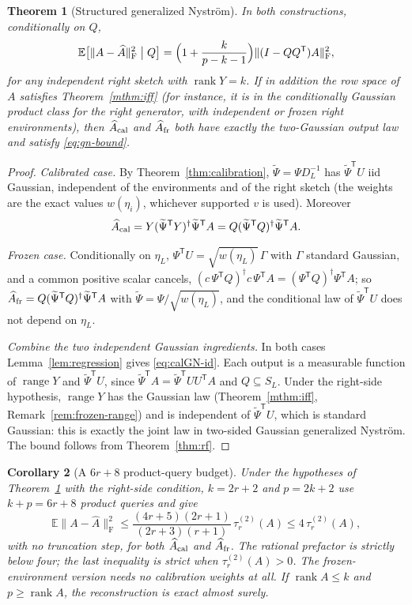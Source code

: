 \documentclass[11pt,a4paper]{article}
\newtheorem{theorem}{Theorem}[section]
\newtheorem{corollary}[theorem]{Corollary}
\theoremstyle{definition}
\theoremstyle{remark}
\numberwithin{equation}{section}
\newcommand{\E}{\mathbb E}
\newcommand{\T}{{\mathsf T}}
\newcommand{\rank}{\operatorname{rank}}
\newcommand{\range}{\operatorname{range}}
\newcommand{\norm}[1]{\lVert#1\rVert}
\newcommand{\F}{\mathrm F}
\begin{document}
\begin{theorem}[Structured generalized Nystr\"om]\label{thm:calGN}
In both constructions, conditionally on $Q$,
\begin{equation}\label{eq:calGN-id}
 \E\bigl[\norm{A-\widehat A}_\F^2\bigm| Q\bigr]
 =\Bigl(1+\frac k{p-k-1}\Bigr)\norm{(I-QQ^\T)A}_\F^2 ,
\end{equation}
for any independent right sketch with $\rank Y=k$. If in addition the row
space of $A$ satisfies Theorem~\ref{mthm:iff} (for instance, it is in the
conditionally Gaussian product class for the right generator, with
independent or frozen right environments), then $\widehat A_{\rm cal}$ and
$\widehat A_{\rm fr}$ both have exactly the two-Gaussian output law and satisfy
\eqref{eq:gn-bound}.
\end{theorem}

\begin{proof}
\emph{Calibrated case.} By Theorem~\ref{thm:calibration}, $\widetilde\Psi=\Psi D_L^{-1}$
has $\widetilde\Psi^\T U$ iid Gaussian, independent of the environments and of
the right sketch (the weights are the exact values $w(\eta_i)$, whichever
supported $v$ is used). Moreover
\[
 \widehat A_{\rm cal}
 =Y(\widetilde\Psi^\T Y)^\dagger\widetilde\Psi^\T A
 =Q(\widetilde\Psi^\T Q)^\dagger\widetilde\Psi^\T A.
\]

\emph{Frozen case.} Conditionally
on $\eta_L$, $\Psi^\T U=\sqrt{w(\eta_L)}\,\Gamma$ with $\Gamma$ standard Gaussian,
and a common positive scalar cancels,
$(c\,\Psi^\T Q)^\dagger c\,\Psi^\T A=(\Psi^\T Q)^\dagger\Psi^\T A$; so
$\widehat A_{\rm fr}=Q(\widetilde\Psi^\T Q)^\dagger\widetilde\Psi^\T A$ with
$\widetilde\Psi=\Psi/\sqrt{w(\eta_L)}$, and the conditional law of
$\widetilde\Psi^\T U$ does not depend on $\eta_L$.

\emph{Combine the two independent Gaussian ingredients.} In both cases
Lemma~\ref{lem:regression} gives \eqref{eq:calGN-id}. Each output is a
measurable function of $\range Y$ and $\widetilde\Psi^\T U$, since
$\widetilde\Psi^\T A=\widetilde\Psi^\T UU^\T A$ and $Q\subseteq S_L$. Under the
right-side hypothesis, $\range Y$ has the Gaussian law
(Theorem~\ref{mthm:iff}, Remark~\ref{rem:frozen-range}) and is independent of
$\widetilde\Psi^\T U$, which is standard Gaussian: this is exactly the joint law
in two-sided Gaussian generalized Nystr\"om. The bound follows from
Theorem~\ref{thm:rf}.
\end{proof}

\begin{corollary}[A $6r+8$ product-query budget]\label{cor:6r8}
Under the hypotheses of Theorem~\ref{thm:calGN} with the right-side condition,
$k=2r+2$ and $p=2k+2$ use $k+p=6r+8$ product queries and give
\[
 \E\norm{A-\widehat A}_\F^2\le\frac{(4r+5)(2r+1)}{(2r+3)(r+1)}\,\tau_r^{(2)}(A)
 \le4\,\tau_r^{(2)}(A),
\]
with no truncation step, for both $\widehat A_{\rm cal}$ and $\widehat A_{\rm fr}$.
The rational prefactor is strictly below four; the last inequality is strict
when $\tau_r^{(2)}(A)>0$.
The frozen-environment version needs no calibration weights at all. If
$\rank A\le k$ and $p\ge\rank A$, the reconstruction is exact almost surely.
\end{corollary}
\end{document}
